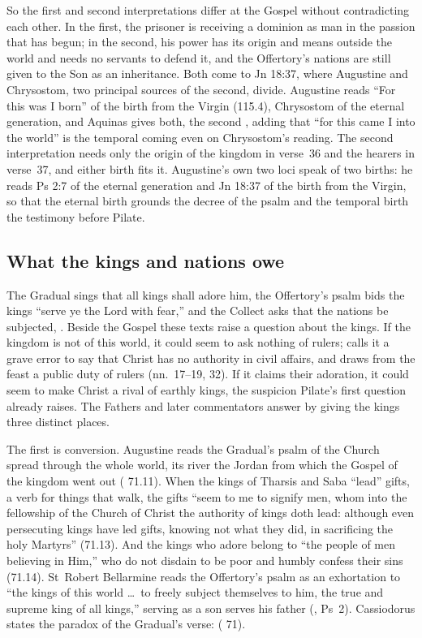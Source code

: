 So the first and second interpretations differ at the Gospel without
contradicting each other. In the first, the prisoner is receiving a dominion as
man in the passion that has begun; in the second, his power has its origin and
means outside the world and needs no servants to defend it, and the Offertory's
nations are still given to the Son as an inheritance. Both come to Jn 18:37, where Augustine and Chrysostom, two
principal sources of the second, divide. Augustine
reads ``For this was I born'' of the birth from the Virgin (115.4), Chrysostom
of the eternal generation, and Aquinas gives both, the second , adding that ``for this came I into the world''
is the temporal coming even on Chrysostom's reading. The second interpretation
needs only the origin of the kingdom in verse~36 and the hearers in verse~37,
and either birth fits it. Augustine's own two loci speak of two births: he reads
Ps 2:7 of the eternal generation and Jn 18:37 of the birth from the Virgin,
so that the eternal birth grounds the decree of the psalm and the temporal
birth the testimony before Pilate.

\subsection{What the kings and nations owe}

The Gradual sings that all kings shall adore him, the Offertory's psalm bids
the kings ``serve ye the Lord with fear,'' and the Collect asks that the
nations be subjected, . Beside the Gospel these texts raise a
question about the kings. If the kingdom is not of this world, it could seem
to ask nothing of rulers;  calls it a grave error to say
that Christ has no authority in civil affairs, and draws from the feast a
public duty of rulers (nn.~17--19, 32). If it claims their adoration, it could
seem to make Christ a rival of earthly kings, the suspicion Pilate's first
question already raises. The Fathers
and later commentators answer by giving the kings three distinct places.

The first is conversion. Augustine reads the Gradual's psalm of the Church
spread through the whole world, its river the Jordan from which the Gospel of
the kingdom went out ( 71.11). When the kings of
Tharsis and Saba ``lead'' gifts, a verb for things that walk, the gifts ``seem
to me to signify men, whom into the fellowship of the Church of Christ the
authority of kings doth lead: although even persecuting kings have led gifts,
knowing not what they did, in sacrificing the holy Martyrs'' (71.13). And the
kings who adore belong to ``the people of men believing in Him,'' who do not
disdain to be poor and humbly confess their sins (71.14). St~Robert Bellarmine
reads the Offertory's psalm as an exhortation to ``the kings of this world
\dots\ to freely subject themselves to him, the true and supreme king of all
kings,'' serving as a son serves his father (, Ps~2).
Cassiodorus states the paradox of the Gradual's verse:  ( 71).

